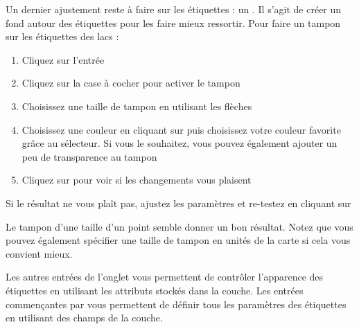 Un dernier ajustement reste à faire sur les étiquettes : un . Il s'agit de créer un fond autour des étiquettes pour les faire mieux ressortir. Pour faire un tampon sur les étiquettes des lacs :

\begin{enumerate}
\item Cliquez sur l'entrée 
\item Cliquez sur la case à cocher  pour activer le tampon
\item Choisissez une taille de tampon en utilisant les flèches
\item Choisissez une couleur en cliquant sur  puis choisissez votre couleur favorite grâce au sélecteur. Si vous le souhaitez, vous pouvez également ajouter un peu de transparence au tampon
\item Cliquez sur  pour voir si les changements vous plaisent
\end{enumerate}

Si le résultat ne vous plaît pas, ajustez les paramètres et re-testez en cliquant sur 

Le tampon d'une taille d'un point semble donner un bon résultat. Notez que vous pouvez également spécifier une taille de tampon en unités de la carte si cela vous convient mieux.

Les autres entrées de l'onglet  vous permettent de contrôler l'apparence des étiquettes en utilisant les attributs stockés dans la couche. Les entrées commençantes par  vous permettent de définir tous les paramètres des étiquettes en utilisant des champs de la couche.

